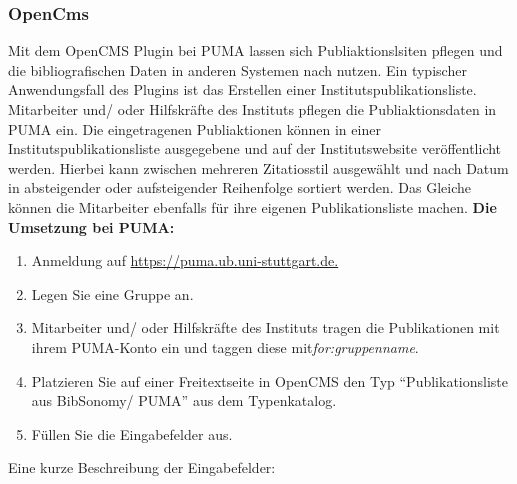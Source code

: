 \subsubsection{OpenCms}
Mit dem OpenCMS Plugin bei PUMA lassen sich Publiaktionslsiten pflegen und die bibliografischen Daten in anderen Systemen nach nutzen. Ein typischer Anwendungsfall des Plugins ist das Erstellen einer Institutspublikationsliste. Mitarbeiter und/ oder Hilfskräfte des Instituts pflegen die Publiaktionsdaten in PUMA ein. Die eingetragenen Publiaktionen können in einer Institutspublikationsliste ausgegebene und auf der Institutswebsite veröffentlicht werden. Hierbei kann zwischen mehreren Zitatiosstil ausgewählt und nach Datum in absteigender oder aufsteigender Reihenfolge sortiert werden. Das Gleiche können die Mitarbeiter ebenfalls für ihre eigenen Publikationsliste machen.\newline
\textbf{Die Umsetzung bei PUMA:}\newline
\begin{enumerate}
\item  Anmeldung auf \url{https://puma.ub.uni-stuttgart.de.}
\item Legen Sie eine Gruppe an.
\item Mitarbeiter und/ oder Hilfskräfte des Instituts tragen die Publikationen mit ihrem PUMA-Konto ein und taggen diese mit\textit{for:gruppenname}.
\item Platzieren Sie auf einer Freitextseite in OpenCMS den Typ \enquote{Publikationsliste aus BibSonomy/ PUMA} aus dem Typenkatalog.
\item Füllen Sie die Eingabefelder aus.
\end{enumerate}
Eine kurze Beschreibung der Eingabefelder:\newline
\small
